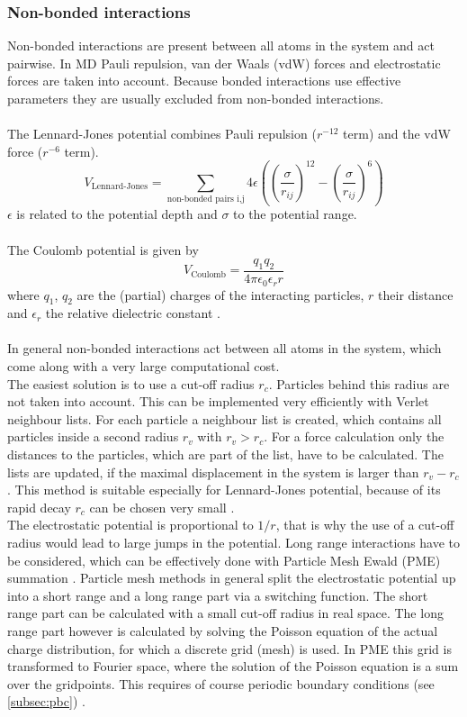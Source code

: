 \subsubsection{Non-bonded interactions}
Non-bonded interactions are present between all atoms in the system and act pairwise. In MD Pauli repulsion, van der Waals (vdW) forces and electrostatic forces are taken into account. Because bonded interactions use effective parameters they are usually excluded from non-bonded interactions.\\
\\
The Lennard-Jones potential combines Pauli repulsion ($r^{-12}$ term) and the vdW force ($r^{-6}$ term).
\begin{equation}
V_\text{Lennard-Jones} = \sum_{\text{non-bonded pairs i,j}} 4 \epsilon\left(\left(\frac{\sigma}{r_{ij}}\right)^{12} - \left(\frac{\sigma}{r_{ij}}\right)^6\right)
\end{equation}
$\epsilon$ is related to the potential depth and $\sigma$ to the potential range.\\
\\
The Coulomb potential is given by
\begin{equation}
V_\text{Coulomb} = \frac{q_1 q_2}{4 \pi \epsilon_0 \epsilon_r r}
\end{equation}
where $q_1$, $q_2$ are the (partial) charges of the interacting particles, $r$ their distance and $\epsilon_r$ the relative dielectric constant \autocite[p. 65-71]{gromacsManual}.\\
\\
In general non-bonded interactions act between all atoms in the system, which come along with a very large computational cost.\\
The easiest solution is to use a cut-off radius $r_c$. Particles behind this radius are not taken into account. This can be implemented very efficiently with Verlet neighbour lists. For each particle a neighbour list is created, which contains all particles inside a second radius $r_v$ with $r_v > r_c$. For a force calculation only the distances to the particles, which are part of the list, have to be calculated. The lists are updated, if the maximal displacement in the system is larger than $r_v - r_c$. This method is suitable especially for Lennard-Jones potential, because of its rapid decay $r_c$ can be chosen very small \autocite[p. 144]{greenBook}.\\
The electrostatic potential is proportional to $1/r$, that is why the use of a cut-off radius would lead to large jumps in the potential. Long range interactions have to be considered, which can be effectively done with Particle Mesh Ewald (PME) summation \autocite{pme}. Particle mesh methods in general split the electrostatic potential up into a short range and a long range part via a switching function. The short range part can be calculated with a small cut-off radius in real space. The long range part however is calculated by solving the Poisson equation of the actual charge distribution, for which a discrete grid (mesh) is used. In PME this grid is transformed to Fourier space, where the solution of the Poisson equation is a sum over the gridpoints. This requires of course periodic boundary conditions (see \autoref*{subsec:pbc}) \autocite[p. 246-251]{greenBook}.
